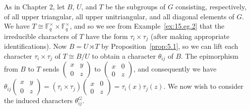 \documentclass[../Odyssey_Project.tex]{subfiles}
\begin{document}
\noindent As in Chapter 2, let $B$, $U$, and $T$ be the subgroups of $G$ consisting, respectively, of all upper triangular, all upper unitriangular, and all diagonal elements of $G$. We have $T \cong \mathbb{F}_q^\times \times \mathbb{F}_q^\times$, and so we see from Example~\ref{ex:15.eg.2} that the irreducible characters of $T$ have the form $\tau_i \times \tau_j$ (after making appropriate identifications). Now $B = U \rtimes T$ by Proposition~\ref{prop:5.1}, so we can lift each character $\tau_i \times \tau_j$ of $T \cong B/U$ to obtain a character $\theta_{ij}$ of $B$. The epimorphism from $B$ to $T$ sends $\begin{pmatrix} x & y \\ 0 & z \end{pmatrix}$ to $\begin{pmatrix} x & 0 \\ 0 & z \end{pmatrix}$, and consequently we have $\theta_{ij}\begin{pmatrix} x & y \\ 0 & z \end{pmatrix} = (\tau_i \times \tau_j)\begin{pmatrix} x & 0 \\ 0 & z \end{pmatrix} = \tau_i(x) \tau_j(z)$. We now wish to consider the induced characters $\theta_{ij}^G$.
\end{document}
